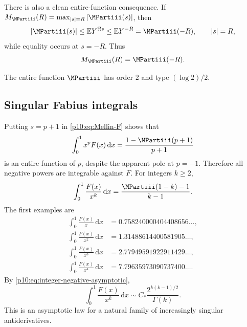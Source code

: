 \documentclass[11pt,oneside]{article}
\theoremstyle{definition}
\theoremstyle{remark}
\newcommand{\F}{F}
\newcommand{\E}{\mathbb E}
\newcommand{\dd}{\,\mathrm d}
\newcommand{\1}{\mathbf 1}
\begin{document}
There is also a clean entire-function consequence.  If
\(M_{\MPartiii}(R)=\max_{|s|=R}|\MPartiii(s)|\), then
\begin{equation}\label{p10:eq:maxmod-equality}
 |\MPartiii(s)|\le\E Y^{\Re s}\le\E Y^{-R}=\MPartiii(-R),
 \qquad |s|=R,
\end{equation}
while equality occurs at \(s=-R\).  Thus
\begin{equation}\label{p10:eq:maxmod-exact}
 M_{\MPartiii}(R)=\MPartiii(-R).
\end{equation}

\begin{corollary}\label{p10:cor:order-type}
The entire function \(\MPartiii\) has order \(2\) and type \((\log2)/2\).
\end{corollary}

\subsection{Singular Fabius integrals}

Putting \(s=p+1\) in \cref{p10:eq:Mellin-F} shows that
\begin{equation}\label{p10:eq:weighted-F-complete}
 \int_0^1x^p\F(x)\dd x
 =\frac{1-\MPartiii(p+1)}{p+1}
\end{equation}
is an entire function of \(p\), despite the apparent pole at \(p=-1\).  Therefore
all negative powers are integrable against \(\F\).  For integers \(k\ge2\),
\begin{equation}\label{p10:eq:singular-F-integers}
 \int_0^1\frac{\F(x)}{x^k}\dd x
 =\frac{\MPartiii(1-k)-1}{k-1}.
\end{equation}
The first examples are
\begin{align}
 \int_0^1\frac{\F(x)}{x}\dd x
 &=0.758240000404408656\ldots,\nonumber\\
 \int_0^1\frac{\F(x)}{x^2}\dd x
 &=1.31488614400581905\ldots,\nonumber\\
 \int_0^1\frac{\F(x)}{x^3}\dd x
 &=2.77949591922911429\ldots,\nonumber\\
 \int_0^1\frac{\F(x)}{x^4}\dd x
 &=7.79635973090737400\ldots.\label{p10:eq:singular-F-values}
\end{align}
By \cref{p10:eq:integer-negative-asymptotic},
\begin{equation}\label{p10:eq:singular-F-asymptotic}
 \int_0^1\frac{\F(x)}{x^k}\dd x
 \sim C_*\frac{2^{k(k-1)/2}}{\Gamma(k)}.
\end{equation}
This is an asymptotic law for a natural family of increasingly singular antiderivatives.
\end{document}

